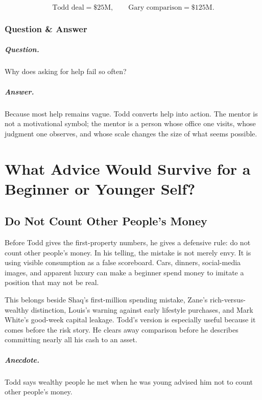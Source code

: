 \documentclass[11pt,oneside]{book}
\begin{document}
\begin{equation}
\text{Todd deal}=\$25\mathrm{M},
\qquad
\text{Gary comparison}=\$125\mathrm{M}.
\end{equation}

\subsection{Question \& Answer}

\paragraph{Question.}
Why does asking for help fail so often?

\paragraph{Answer.}
Because most help remains vague. Todd converts help into action. The mentor is not a motivational symbol; the mentor is a person whose office one visits, whose judgment one observes, and whose scale changes the size of what seems possible.

\chapter{What Advice Would Survive for a Beginner or Younger Self?}

\section{Do Not Count Other People's Money}

Before Todd gives the first-property numbers, he gives a defensive rule: do not count other people's money. In his telling, the mistake is not merely envy. It is using visible consumption as a false scoreboard. Cars, dinners, social-media images, and apparent luxury can make a beginner spend money to imitate a position that may not be real.

This belongs beside Shaq's first-million spending mistake, Zane's rich-versus-wealthy distinction, Louis's warning against early lifestyle purchases, and Mark White's good-week capital leakage. Todd's version is especially useful because it comes before the risk story. He clears away comparison before he describes committing nearly all his cash to an asset.

\paragraph{Anecdote.}
Todd says wealthy people he met when he was young advised him not to count other people's money.
\end{document}
